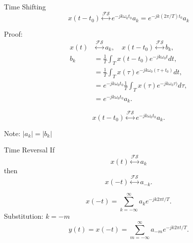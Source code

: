 \begin{frame}[plain]{Time Shifting}
    \begin{equation}
        x(t-t_0) \overset{\mathcal{FS}}{\longleftrightarrow} e^{-jk\omega_0 t_0}a_k = e^{-jk(2\pi/T) t_0}a_k
    \end{equation}
    {
        \noindent Proof:\\%
        \pause
        \begin{equation*}
            \begin{aligned}
          x(t) &\overset{\mathcal{FS}}{\longleftrightarrow} a_k, \quad x(t-t_0) \overset{\mathcal{FS}}{\longleftrightarrow} b_k,\\
                b_k &=  \frac{1}{T}\int_{T}x(t-t_0)e^{-jk\omega_0 t}dt,\\
                &= \frac{1}{T}\int_{T}x(\tau)e^{-jk\omega_0(\tau + t_0)}dt,\\
                &= e^{-jk\omega_0  t_0}\frac{1}{T}\int_{T}x(\tau)e^{-jk\omega_0\tau)}d\tau,\\
                &= e^{-jk\omega_0  t_0}a_k.
            \end{aligned}
        \end{equation*}

        \begin{equation*}
             x(t-t_0) \overset{\mathcal{FS}}{\longleftrightarrow} e^{-jk\omega_0  t_0}a_k.
        \end{equation*}

        Note: $|a_k| = |b_k|$
    }
\end{frame}


\begin{frame}[plain]{Time Reversal}
    If
    \begin{equation}
        x(t) \overset{\mathcal{FS}}{\longleftrightarrow} a_k
    \end{equation}
    then
    \begin{equation}
        x(-t) \overset{\mathcal{FS}}{\longleftrightarrow} a_{-k}.
    \end{equation}
    {
        \begin{equation}
            x(-t) =  \sum_{k=-\infty}^{\infty}a_ke^{-jk2\pi t/T}.
        \end{equation}
        Substitution: $k=-m$
        \begin{equation*}
            y(t) = x(-t) = \sum_{m=-\infty}^{\infty}a_{-m}e^{-jk2\pi t/T}.
        \end{equation*}
        \pause

    }
\end{frame}

